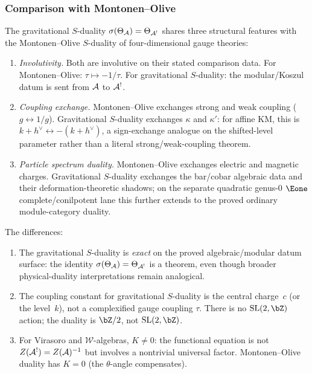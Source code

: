 \subsubsection{Comparison with Montonen--Olive}

\begin{remark}
\label{rem:thqg-IV-montonen-olive}
The gravitational $S$-duality $\sigma(\Theta_{\mathcal{A}}) = \Theta_{\mathcal{A}^!}$
shares three structural features with the Montonen--Olive $S$-duality
of four-dimensional gauge theories:
\begin{enumerate}[label=\textup{(\roman*)}]
\item \emph{Involutivity.} Both are involutive on their stated
 comparison data. For Montonen--Olive: $\tau \mapsto -1/\tau$.
 For gravitational $S$-duality: the modular/Koszul datum is sent
 from $\mathcal{A}$ to $\mathcal{A}^!$.
\item \emph{Coupling exchange.} Montonen--Olive exchanges strong and
 weak coupling ($g \leftrightarrow 1/g$). Gravitational $S$-duality
 exchanges $\kappa$ and $\kappa'$: for affine KM, this is
 $k + h^\vee \leftrightarrow -(k + h^\vee)$, a sign-exchange
 analogue on the shifted-level parameter rather than a literal
 strong/weak-coupling theorem.
\item \emph{Particle spectrum duality.} Montonen--Olive exchanges
 electric and magnetic charges. Gravitational $S$-duality exchanges
 the bar/cobar algebraic data and their deformation-theoretic
 shadows; on the separate quadratic genus-$0$ $\Eone$
 complete/conilpotent lane this further extends to the proved
 ordinary module-category duality.
\end{enumerate}

The differences:
\begin{enumerate}[label=\textup{(\roman*)}]
\item The gravitational $S$-duality is \emph{exact} on the proved
 algebraic/modular datum surface:
 the identity $\sigma(\Theta_{\mathcal{A}}) = \Theta_{\mathcal{A}^!}$ is a theorem,
 even though broader physical-duality interpretations remain
 analogical.
\item The coupling constant for gravitational $S$-duality is
 the central charge~$c$ (or the level~$k$), not a complexified gauge
 coupling $\tau$. There is no $\mathrm{SL}(2, \bZ)$
 action; the duality is $\bZ/2$, not $\mathrm{SL}(2, \bZ)$.
\item For Virasoro and $\mathcal{W}$-algebras, $K \neq 0$: the
 functional equation is not $Z(\mathcal{A}^!) = Z(\mathcal{A})^{-1}$ but involves a
 nontrivial universal factor. Montonen--Olive duality has $K = 0$
 (the $\theta$-angle compensates).
\end{enumerate}
\end{remark}

